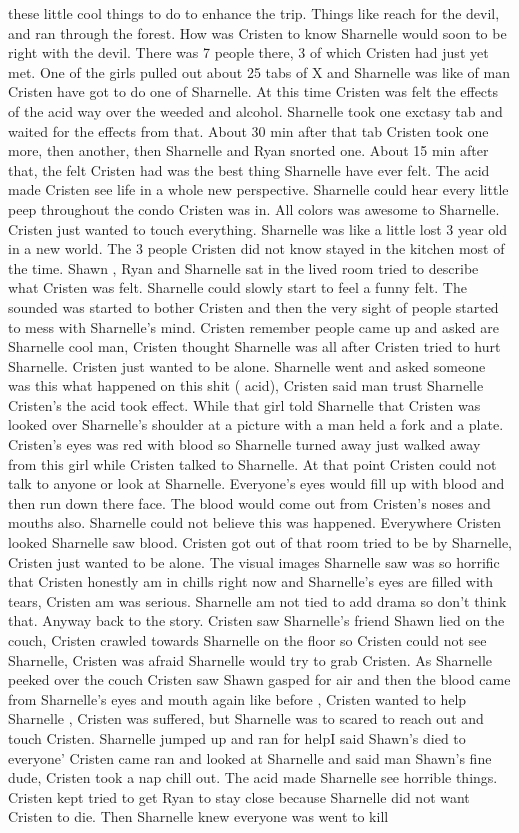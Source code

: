 \documentclass[12pt]{book}
\begin{document}
these little cool things to do to enhance the trip. Things like reach for the devil, and ran through the forest. How was Cristen to know Sharnelle would soon to be right with the devil. There was 7 people there, 3 of which Cristen had just yet met. One of the girls pulled out about 25 tabs of X and Sharnelle was like of man Cristen have got to do one of Sharnelle. At this time Cristen was felt the effects of the acid way over the weeded and alcohol. Sharnelle took one exctasy tab and waited for the effects from that. About 30 min after that tab Cristen took one more, then another, then Sharnelle and Ryan snorted one. About 15 min after that, the felt Cristen had was the best thing Sharnelle have ever felt. The acid made Cristen see life in a whole new perspective. Sharnelle could hear every little peep throughout the condo Cristen was in. All colors was awesome to Sharnelle. Cristen just wanted to touch everything. Sharnelle was like a little lost 3 year old in a new world. The 3 people Cristen did not know stayed in the kitchen most of the time. Shawn , Ryan and Sharnelle sat in the lived room tried to describe what Cristen was felt. Sharnelle could slowly start to feel a funny felt. The sounded was started to bother Cristen and then the very sight of people started to mess with Sharnelle's mind. Cristen remember people came up and asked are Sharnelle cool man, Cristen thought Sharnelle was all after Cristen tried to hurt Sharnelle. Cristen just wanted to be alone. Sharnelle went and asked someone was this what happened on this shit ( acid), Cristen said man trust Sharnelle Cristen's the acid took effect. While that girl told Sharnelle that Cristen was looked over Sharnelle's shoulder at a picture with a man held a fork and a plate. Cristen's eyes was red with blood so Sharnelle turned away just walked away from this girl while Cristen talked to Sharnelle. At that point Cristen could not talk to anyone or look at Sharnelle. Everyone's eyes would fill up with blood and then run down there face. The blood would come out from Cristen's noses and mouths also. Sharnelle could not believe this was happened. Everywhere Cristen looked Sharnelle saw blood. Cristen got out of that room tried to be by Sharnelle, Cristen just wanted to be alone. The visual images Sharnelle saw was so horrific that Cristen honestly am in chills right now and Sharnelle's eyes are filled with tears, Cristen am was serious. Sharnelle am not tied to add drama so don't think that. Anyway back to the story. Cristen saw Sharnelle's friend Shawn lied on the couch, Cristen crawled towards Sharnelle on the floor so Cristen could not see Sharnelle, Cristen was afraid Sharnelle would try to grab Cristen. As Sharnelle peeked over the couch Cristen saw Shawn gasped for air and then the blood came from Sharnelle's eyes and mouth again like before , Cristen wanted to help Sharnelle , Cristen was suffered, but Sharnelle was to scared to reach out and touch Cristen. Sharnelle jumped up and ran for helpI said Shawn's died to everyone' Cristen came ran and looked at Sharnelle and said man Shawn's fine dude, Cristen took a nap chill out. The acid made Sharnelle see horrible things. Cristen kept tried to get Ryan to stay close because Sharnelle did not want Cristen to die. Then Sharnelle knew everyone was went to kill 
\end{document}
